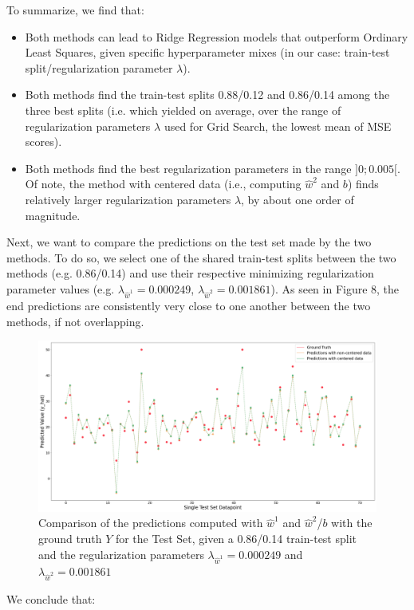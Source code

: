 \documentclass{homework}
\begin{document}
To summarize, we find that:

\begin{itemize}
    \item Both methods can lead to Ridge Regression models that outperform Ordinary Least Squares, given specific hyperparameter mixes 
    (in our case: train-test split/regularization parameter $\lambda$).
    \item Both methods find the train-test splits 0.88/0.12 and 0.86/0.14 among the three best splits (i.e. which yielded on average, 
    over the range of regularization parameters $\lambda$ used for Grid Search, the lowest mean of MSE scores).
    \item Both methods find the best regularization parameters in the range $]0; 0.005[$. Of note, the method with centered data 
    (i.e., computing $\hat{w}^2$ and $b$) finds relatively larger regularization parameters $\lambda$, by about one order of magnitude.
\end{itemize}

Next, we want to compare the predictions on the test set made by the two methods. To do so, we select one of the shared train-test splits
between the two methods (e.g. 0.86/0.14) and use their respective minimizing regularization parameter values (e.g. $\lambda_{\hat{w}^1}=0.000249$,
$\lambda_{\hat{w}^2}=0.001861$). As seen in Figure 8, the end predictions are consistently very close to one another between the two methods, 
if not overlapping.

\begin{figure}[H]
\begin{center}
\includegraphics[width=\textwidth]{images/w1_w2_compare_best_regs.png}
\end{center}
\caption{Comparison of the predictions computed with $\hat{w}^1$ and $\hat{w}^2$/$b$ with the ground truth $Y$ for the 
Test Set, given a 0.86/0.14 train-test split and the regularization parameters $\lambda_{\hat{w}^1}=0.000249$ and 
$\lambda_{\hat{w}^2}=0.001861$}
\end{figure}
We conclude that:
\end{document}
